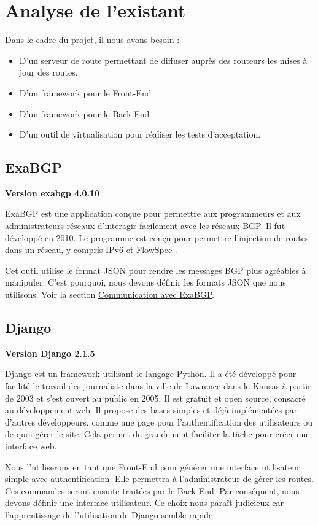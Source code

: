 \chapter{Analyse de l'existant}

Dans le cadre du projet, il nous avons besoin : 

\begin{itemize}
    \item D'un serveur de route permettant de diffuser auprès des routeurs les mises à jour des routes.
    \item D'un framework pour le Front-End
    \item D'un framework pour le Back-End
    \item D'un outil de virtualisation pour réaliser les tests d'acceptation.
\end{itemize}

\section{ExaBGP}
\textbf{Version exabgp 4.0.10}

ExaBGP \cite{Exa13} est une application conçue pour permettre aux programmeurs et aux administrateurs réseaux d’interagir facilement avec les réseaux BGP. Il fut développé en 2010. Le programme est conçu pour permettre l’injection de routes dans un réseau, y compris IPv6 et FlowSpec \cite{Man10}.

Cet outil utilise le format JSON pour rendre les messages BGP plus agréables à manipuler. C'est pourquoi, nous devons définir les formats JSON que nous utilisons. Voir la section \hyperref[sssec:exabgp]{Communication avec ExaBGP}.

\section{Django}
\textbf{Version Django 2.1.5}

Django \cite{Django03} est un framework utilisant le langage Python. Il a été développé pour facilité le travail des journaliste dans la ville de Lawrence dans le Kansas à partir de 2003 et s'est ouvert au public en 2005. Il est gratuit et open source, consacré au développement web. Il propose des bases simples et déjà implémentées par d'autres développeurs, comme une page pour l'authentification des utilisateurs ou de quoi gérer le site. Cela permet de grandement faciliter la tâche pour créer une interface web. 

Nous l'utiliserons en tant que Front-End pour générer une interface utilisateur simple avec authentification. Elle permettra à l'administrateur de gérer les routes. Ces commandes seront ensuite traitées par le Back-End. Par conséquent, nous devons définir une \hyperref[ssec:ui]{interface utilisateur}. Ce choix nous paraît judicieux car l'apprentissage de l'utilisation de Django semble rapide.

